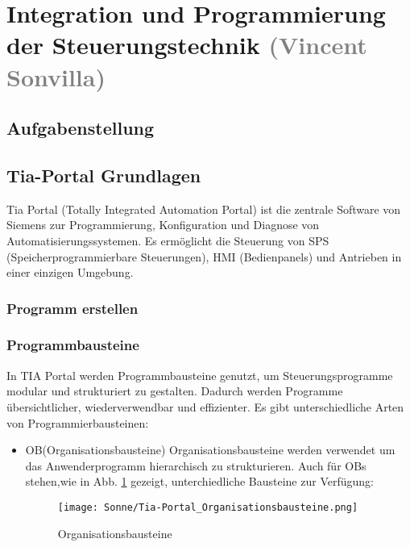 \section{Integration und Programmierung der Steuerungstechnik \textcolor{gray}{ (Vincent Sonvilla)}}


\subsection{Aufgabenstellung}

\subsection{Tia-Portal Grundlagen}

Tia Portal (Totally Integrated Automation Portal) ist die zentrale Software von Siemens zur Programmierung, Konfiguration und Diagnose von Automatisierungssystemen. Es ermöglicht die Steuerung von SPS (Speicherprogrammierbare Steuerungen), HMI (Bedienpanels) und Antrieben in einer einzigen Umgebung.

    \subsubsection{Programm erstellen}

    \subsubsection{Programmbausteine}
    
    In TIA Portal werden Programmbausteine genutzt, um Steuerungsprogramme modular und strukturiert zu gestalten. Dadurch werden Programme übersichtlicher, wiederverwendbar und effizienter. Es gibt unterschiedliche Arten von Programmierbausteinen:

    \begin{itemize}
        \item[1.] OB(Organisationsbausteine)
            Organisationsbausteine werden verwendet um das Anwenderprogramm hierarchisch zu strukturieren. Auch für OBs stehen,wie in Abb. \ref{Organisationsbausteine} gezeigt, unterchiedliche Bausteine zur Verfügung:
            \begin{figure}[h]
                \texttt{[image: Sonne/Tia-Portal\_Organisationsbausteine.png]}
                \caption{Organisationsbausteine}
                \label{Organisationsbausteine}
            \end{figure}
    \end{itemize}

